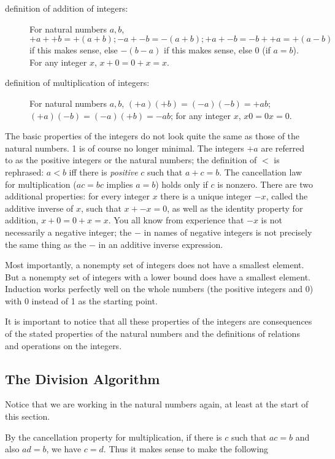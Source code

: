 \documentclass[12pt]{article}
\begin{document}
\begin{description}

\item[definition of addition  of integers:]  For natural numbers $a,b$, $+a + +b = +(a+b); -a + -b = -(a+b); +a + -b = -b+ +a = +(a-b)$ if this makes sense,
else $-(b-a)$ if this makes sense, else 0 (if $a=b$).  For any integer $x$, $x+0=0+x=x$.

\item[definition of multiplication  of integers:]  For natural numbers $a,b$, $(+a)(+b) = (-a)(-b) = +ab$; $(+a)(-b)=(-a)(+b)=-ab$;  for any integer $x$, $x0=0x=0$.

\end{description}

The basic properties of the integers do not look quite the same as those of the natural numbers.   1 is of course no longer minimal.
The integers $+a$ are referred to as the positive integers or the natural numbers; the definition of
$<$ is rephrased:  $a<b$ iff there is {\em positive\/} $c$ such that $a+c=b$.   The cancellation law for multiplication ($ac=bc$ implies $a=b$) holds only if $c$ is nonzero.   There are two additional properties:  for every integer $x$ there is a unique integer $-x$, called the additive inverse of $x$, such that $x+ -x=0$, as well as the identity property for addition, $x+0=0+x=x$.  You all know from experience that $-x$ is not necessarily a negative integer; the $-$ in names of negative integers is not precisely the same thing as the $-$ in an additive inverse expression.

Most importantly, a nonempty set of integers does not have a smallest element.  But a nonempty set of integers with a lower bound does have a smallest element.   Induction works perfectly well on the whole numbers (the positive integers and 0) with 0 instead of 1 as the starting point.

It is important to notice that all these properties of the integers are consequences of the stated properties of the natural numbers and the definitions of relations and operations on the integers.

\subsection{The Division Algorithm}

Notice that we are working in the natural numbers again, at least at the start of this section.

By the cancellation property for multiplication, if there is $c$ such that $ac=b$ and also $ad=b$, we have $c=d$.
Thus it makes sense to make the following
\end{document}
